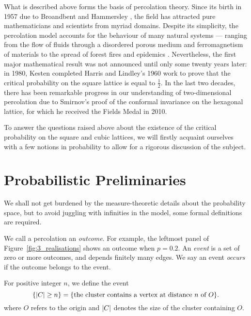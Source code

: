 \documentclass[a4paper, 12pt]{article}
\begin{document}
What is described above forms the basis of percolation theory. Since its birth in 1957 due to Broandbent and Hammersley \autocite*[693]{broadbent_hammersley_1957}, the field has attracted pure mathematicians and scientists from myriad domains. Despite its simplicity, the percolation model accounts for the behaviour of many natural systems --- ranging from the flow of fluids through a disordered porous medium and ferromagnetism of materials to the spread of forest fires and epidemics \autocite[60]{gennes_2000}. Nevertheless, the first major mathematical result was not announced until only some twenty years later: in 1980, Kesten \autocite*[41]{kesten_1980} completed Harris and Lindley's \autocite*[13]{harris_lindley_1960} 1960 work to prove that the critical probability on the square lattice is equal to $\frac{1}{2}$. In the last two decades, there has been remarkable progress in our understanding of two-dimensional percolation due to Smirnov's \autocite*[239]{smirnov_2001} proof of the conformal invariance on the hexagonal lattice, for which he received the Fields Medal in 2010.

To answer the questions raised above about the existence of the critical probability on the square and cubic lattices, we will firstly acquaint ourselves with a few notions in probability to allow for a rigorous discussion of the subject.

\section{Probabilistic Preliminaries}
We shall not get burdened by the measure-theoretic details about the probability space, but to avoid juggling with infinities in the model, some formal definitions are required.

\begin{defn}\label{defn:outcome_and_event}
We call a percolation an \textit{outcome}. For example, the leftmost panel of Figure~\ref{fig:3_realisations} shows an outcome when $p = 0.2$. An \textit{event} is a set of zero or more outcomes, and depends finitely many edges. We say an event \textit{occurs} if the outcome belongs to the event.
\end{defn}

\begin{ex}\label{ex:cluster_of_size_n}
For positive integer $n$, we define the event
\[
\{\lvert C \rvert \geq n\}
= \{\text{the cluster contains a vertex at distance } n \text{ of } O\}.
\]
where $O$ refers to the origin and $\lvert C \rvert$ denotes the size of the cluster containing $O$.
\end{ex}
\end{document}
